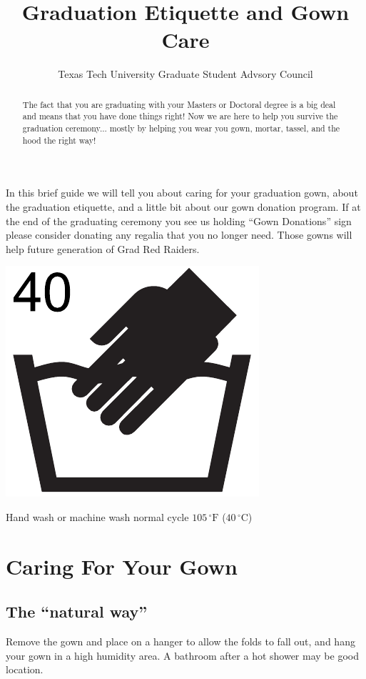 \documentclass{tufte-handout}
\title{Graduation Etiquette and Gown Care}
\author[Texas Tech University Graduate Student Advsory Council]{Texas Tech University Graduate Student Advsory Council}
\date{}  %
\begin{document}
\enlargethispage{\baselineskip}

\maketitle%


\begin{abstract}
\noindent The fact that you are graduating with your Masters or Doctoral degree is a big deal and means that you have done things right! Now we are here to help you survive the graduation ceremony... mostly by helping you wear you gown, mortar, tassel, and the hood the right way!
\end{abstract}

\noindent In this brief guide we will tell you about caring for your graduation gown, about the graduation etiquette, and a little bit about our gown donation program. If at the end of the graduating ceremony you see us holding ``Gown Donations'' sign please consider donating any regalia that you no longer need. Those gowns will help future generation of Grad Red Raiders.

\begin{marginfigure}[-16\baselineskip]%
\hspace*{0.02in}
  \includegraphics[width=.35\linewidth]{hand-40C}
  \caption{\linespread{1.3}\selectfont{}Hand wash or \hspace{\textwidth}machine wash normal cycle \hspace{\textwidth}$105\,^{\circ}\mathrm{F}$ ($40\,^{\circ}\mathrm{C}$)}
  \label{fig:40C}
\end{marginfigure}

\section{Caring For Your Gown}\label{sec:page-layout}

\subsection{The ``natural way''}
Remove the gown and place on a hanger to allow the folds to fall out, and hang your gown in a high humidity area. A bathroom after a hot shower may be good location.
\end{document}
